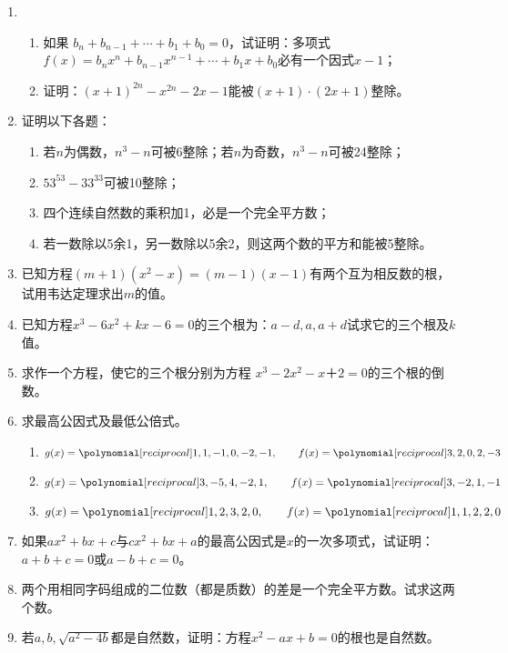 \begin{enumerate}
\item 
\begin{enumerate}
\item 如果 $b_n+b_{n-1}+\cdots+b_1+b_0=0$，试证明：多项式$f(x)=b_nx^n+b_{n-1}x^{n-1}+\cdots+b_1x+b_0$必有一个因式$x-1$；
\item 证明：$(x+1)^{2n}-x^{2n}-2x-1$能被$(x+1)\cdot (2x+1)$整除。
\end{enumerate}

\item 证明以下各题：
\begin{enumerate}
    \item 若$n$为偶数，$n^3-n$可被6整除；若$n$为奇数，$n^3-n$可被24整除；
    \item $53^{53}-33^{33}$可被10整除；
    \item 四个连续自然数的乘积加1，必是一个完全平方数；
    \item 若一数除以5余1，另一数除以5余2，则这两个数的平方和能被5整除。
\end{enumerate}

\item 已知方程$(m+1)(x^2-x)=(m-1)(x-1)$有两个互为相反数的根，试用韦达定理求出$m$的值。
\item 已知方程$x^3-6x^2+kx-6=0$的三个根为：$a-d,a,a+d$试求它的三个根及$k$值。
\item 求作一个方程，使它的三个根分别为方程 $x^3-2x^2-x＋2=0$的三个根的倒数。

\item 求最高公因式及最低公倍式。
\begin{enumerate}
    \item $g(x)=\poly{1,1,-1,0,-2,-1},\qquad f(x)=\poly{3,2,0,2,-3}$
    \item $g(x)=\poly{3,-5,4,-2,1},\qquad f(x)=\poly{3,-2,1,-1}$
    \item $g(x)=\poly{1,2,3,2,0},\qquad f(x)=\poly{1,1,2,2,0}$
\end{enumerate}


\item 如果$ax^2+bx+c$与$cx^2+bx+a$的最高公因式是$x$的一次多项式，试证明：
$a+b+c=0$或$a-b+c=0$。
\item 两个用相同字码组成的二位数（都是质数）的差是一个完全平方数。试求这两个数。
\item 若$a,b,\sqrt{a^2-4b}$都是自然数，证明：方程$x^2-ax+b=0$的根也是自然数。

\end{enumerate}


